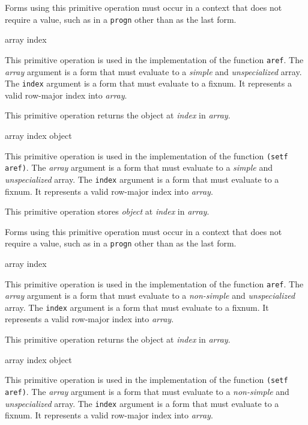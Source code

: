 Forms using this primitive operation must occur in a context that does
not require a value, such as in a \texttt{progn} other than as the
last form.

 {array index}

This primitive operation is used in the implementation of the
\commonlisp{} function \texttt{aref}.  The \textit{array} argument is
a form that must evaluate to a \emph{simple} and \emph{unspecialized}
array.  The \texttt{index} argument is a form that must evaluate to a
fixnum.  It represents a valid row-major index into \textit{array}.

This primitive operation returns the object at \textit{index} in
\textit{array}.

 {array index object}

This primitive operation is used in the implementation of the
\commonlisp{} function \texttt{(setf aref)}.  The \textit{array}
argument is a form that must evaluate to a \emph{simple} and
\emph{unspecialized} array.  The \texttt{index} argument is a form
that must evaluate to a fixnum.  It represents a valid row-major index
into \textit{array}.

This primitive operation stores \textit{object} at \textit{index} in
\textit{array}.

Forms using this primitive operation must occur in a context that does
not require a value, such as in a \texttt{progn} other than as the
last form.

 {array index}

This primitive operation is used in the implementation of the
\commonlisp{} function \texttt{aref}.  The \textit{array} argument is
a form that must evaluate to a \emph{non-simple} and
\emph{unspecialized} array.  The \texttt{index} argument is a form
that must evaluate to a fixnum.  It represents a valid row-major index
into \textit{array}.

This primitive operation returns the object at \textit{index} in
\textit{array}.

 {array index object}

This primitive operation is used in the implementation of the
\commonlisp{} function \texttt{(setf aref)}.  The \textit{array}
argument is a form that must evaluate to a \emph{non-simple} and
\emph{unspecialized} array.  The \texttt{index} argument is a form
that must evaluate to a fixnum.  It represents a valid row-major index
into \textit{array}.

